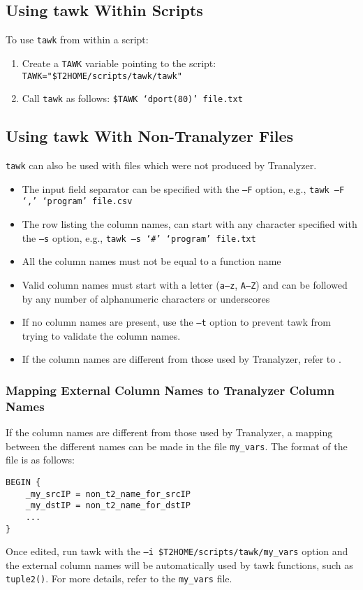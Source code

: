 \documentclass[documentation]{subfiles}
\begin{document}
\subsection{Using tawk Within Scripts}
To use {\tt tawk} from within a script:
\begin{enumerate}
    \item Create a {\tt TAWK} variable pointing to the script: {\tt TAWK="\$T2HOME/scripts/tawk/tawk"}
    \item Call {\tt tawk} as follows: {\tt \$TAWK `dport(80)' file.txt}
\end{enumerate}

\subsection{Using tawk With Non-Tranalyzer Files}\label{tawk-non-tranalyzer}
{\tt tawk} can also be used with files which were not produced by Tranalyzer.

\begin{itemize}
    \item The input field separator can be specified with the {\tt --F} option, e.g., {\tt tawk --F `,' `program' file.csv}
    \item The row listing the column names, can start with any character specified with the {\tt --s} option, e.g., {\tt tawk --s `\#' `program' file.txt}
    \item All the column names must not be equal to a function name
    \item Valid column names must start with a letter ({\tt a--z}, {\tt A--Z}) and can be followed by any number of alphanumeric characters or underscores
    \item If no column names are present, use the {\tt --t} option to prevent tawk from trying to validate the column names.
    \item If the column names are different from those used by Tranalyzer, refer to .
\end{itemize}

\subsubsection{Mapping External Column Names to Tranalyzer Column Names}\label{tawk:my_vars}
If the column names are different from those used by Tranalyzer, a mapping between the different names can be made in the file {\tt my\_vars}.
The format of the file is as follows:
\begin{verbatim}
BEGIN {
    _my_srcIP = non_t2_name_for_srcIP
    _my_dstIP = non_t2_name_for_dstIP
    ...
}
\end{verbatim}
Once edited, run tawk with the {\tt --i \$T2HOME/scripts/tawk/my\_vars} option and the external column names will be automatically used by tawk functions, such as {\tt tuple2()}.
For more details, refer to the {\tt my\_vars} file.
\end{document}
